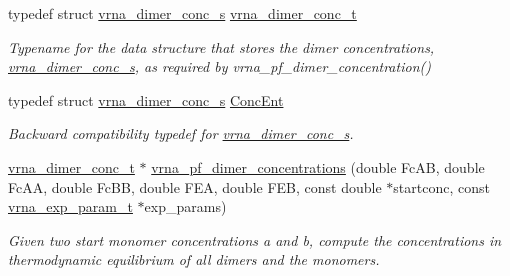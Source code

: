 \begin{DoxyCompactItemize}
\item 
\mbox{\label{group__pf__cofold_gac48c2723444ecfdceafcfd525ca98322}} 
typedef struct \hyperlink{structvrna__dimer__conc__s}{vrna\+\_\+dimer\+\_\+conc\+\_\+s} \hyperlink{group__pf__cofold_gac48c2723444ecfdceafcfd525ca98322}{vrna\+\_\+dimer\+\_\+conc\+\_\+t}
\begin{DoxyCompactList}\small\item\em Typename for the data structure that stores the dimer concentrations, \hyperlink{structvrna__dimer__conc__s}{vrna\+\_\+dimer\+\_\+conc\+\_\+s}, as required by vrna\+\_\+pf\+\_\+dimer\+\_\+concentration() \end{DoxyCompactList}\item 
\mbox{\label{group__pf__cofold_ga46244c7adf5040580291c45b465f4efa}} 
typedef struct \hyperlink{structvrna__dimer__conc__s}{vrna\+\_\+dimer\+\_\+conc\+\_\+s} \hyperlink{group__pf__cofold_ga46244c7adf5040580291c45b465f4efa}{Conc\+Ent}
\begin{DoxyCompactList}\small\item\em Backward compatibility typedef for \hyperlink{structvrna__dimer__conc__s}{vrna\+\_\+dimer\+\_\+conc\+\_\+s}. \end{DoxyCompactList}\item 
\hyperlink{group__pf__cofold_gac48c2723444ecfdceafcfd525ca98322}{vrna\+\_\+dimer\+\_\+conc\+\_\+t} $\ast$ \hyperlink{group__pf__cofold_ga83b8d5d0f7875d6d5013b208f23e3356}{vrna\+\_\+pf\+\_\+dimer\+\_\+concentrations} (double Fc\+AB, double Fc\+AA, double Fc\+BB, double F\+EA, double F\+EB, const double $\ast$startconc, const \hyperlink{group__energy__parameters_ga01d8b92fe734df8d79a6169482c7d8d8}{vrna\+\_\+exp\+\_\+param\+\_\+t} $\ast$exp\+\_\+params)
\begin{DoxyCompactList}\small\item\em Given two start monomer concentrations a and b, compute the concentrations in thermodynamic equilibrium of all dimers and the monomers. \end{DoxyCompactList}\end{DoxyCompactItemize}
